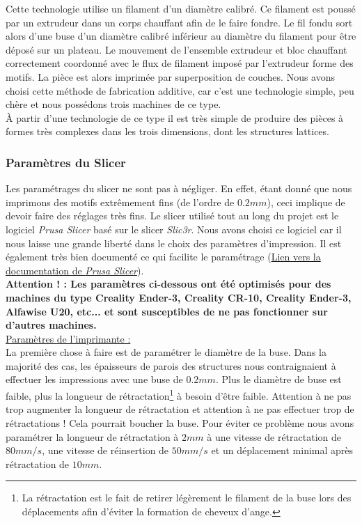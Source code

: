 \documentclass[a4paper]{article}
\begin{document}
	Cette technologie utilise un filament d’un diamètre calibré. Ce filament est poussé par un extrudeur dans un corps chauffant afin de le faire fondre. Le fil fondu sort alors d’une buse d’un diamètre calibré inférieur au diamètre du filament pour être déposé sur un plateau. Le mouvement de l’ensemble extrudeur et bloc chauffant correctement coordonné avec le flux de filament imposé par l’extrudeur forme des motifs. La pièce est alors imprimée par superposition de couches. Nous avons choisi cette méthode de fabrication additive, car c’est une technologie simple, peu chère et nous possédons trois machines de ce type.\\
	
	À partir d’une technologie de ce type il est très simple de produire des pièces à formes très complexes dans les trois dimensions, dont les structures lattices.
	\newpage
	
	\subsubsection{Paramètres du Slicer}
	\hspace{0.5cm}Les paramétrages du slicer ne sont pas à négliger. En effet, étant donné que nous imprimons des motifs extrêmement fins (de l'ordre de $0.2 mm$), ceci implique de devoir faire des réglages très fins. Le slicer utilisé tout au long du projet est le logiciel \textit{Prusa Slicer} basé sur le slicer \textit{Slic3r}. Nous avons choisi ce logiciel car il nous laisse une grande liberté dans le choix des paramètres d'impression. Il est également très bien documenté ce qui facilite le paramétrage (\href{https://help.prusa3d.com/fr/category/prusaslicer_204}{Lien vers la documentation de \textit{Prusa Slicer}}).\\
	
	\textbf{Attention ! : Les paramètres ci-dessous ont été optimisés pour des machines du type Creality Ender-3, Creality CR-10, Creality Ender-3, Alfawise U20, etc... et sont susceptibles de ne pas fonctionner sur d'autres machines.}\\
	
	\underline{Paramètres de l'imprimante :}\\
	
	La première chose à faire est de paramétrer le diamètre de la buse. Dans la majorité des cas, les épaisseurs de parois des structures nous contraignaient à effectuer les impressions avec une buse de $0.2 mm$. Plus le diamètre de buse est faible, plus la longueur de rétractation\footnote{La rétractation est le fait de retirer légèrement le filament de la buse lors des déplacements afin d'éviter la formation de cheveux d'ange.} à besoin d'être faible. Attention à ne pas trop augmenter la longueur de rétractation et attention à ne pas effectuer trop de rétractations ! Cela pourrait boucher la buse. Pour éviter ce problème nous avons paramétrer la longueur de rétractation à $2 mm$ à une vitesse de rétractation de $80 mm/s$, une vitesse de réinsertion de $50 mm/s$ et un déplacement minimal après rétractation de $10 mm$.
	
\end{document}

